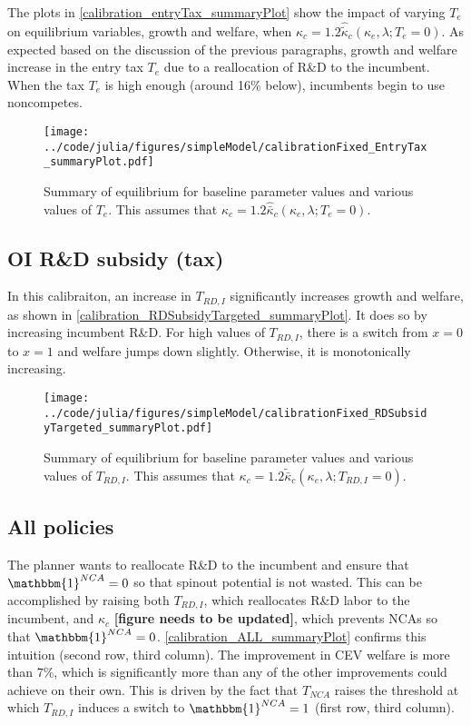 \documentclass[11pt,english]{article}
\begin{document}
The plots in \autoref{calibration_entryTax_summaryPlot} show the impact of varying $T_e$ on equilibrium variables, growth and welfare, when $\kappa_c = 1.2 \hat{\tilde{\kappa}}_c(\kappa_e,\lambda;T_e = 0)$. As expected based on the discussion of the previous paragraphs, growth and welfare increase in the entry tax $T_e$ due to a reallocation of R\&D to the incumbent. When the tax $T_e$ is high enough (around 16\% below), incumbents begin to use noncompetes.  

\begin{figure}[]
	\texttt{[image: ../code/julia/figures/simpleModel/calibrationFixed\_EntryTax\_summaryPlot.pdf]}
	\caption{Summary of equilibrium for baseline parameter values and various values of $T_e$. This assumes that $\kappa_c = 1.2 \hat{\bar{\kappa}}_c(\kappa_e,\lambda;T_e = 0)$.}
	\label{calibration_entryTax_summaryPlot}
\end{figure}

\subsection{OI R\&D subsidy (tax)}\label{cs:oi_rd_subsidy}

In this calibraiton, an increase in $T_{RD,I}$ significantly increases growth and welfare, as shown in \autoref{calibration_RDSubsidyTargeted_summaryPlot}. It does so by increasing incumbent R\&D. For high values of $T_{RD,I}$, there is a switch from $x = 0$ to $x = 1$ and welfare jumps down slightly. Otherwise, it is monotonically increasing. 

\begin{figure}[]
	\texttt{[image: ../code/julia/figures/simpleModel/calibrationFixed\_RDSubsidyTargeted\_summaryPlot.pdf]}
	\caption{Summary of equilibrium for baseline parameter values and various values of $T_{RD,I}$. This assumes that $\kappa_c = 1.2 \tilde{\bar{\kappa}}_c(\kappa_e,\lambda;T_{RD,I} = 0)$.}
	\label{calibration_RDSubsidyTargeted_summaryPlot}
\end{figure}


\subsection{All policies}

The planner wants to reallocate R\&D to the incumbent and ensure that $\mathbbm{1}^{NCA} = 0$ so that spinout potential is not wasted. This can be accomplished by raising both $T_{RD,I}$, which reallocates R\&D labor to the incumbent, and $\kappa_c$ \textbf{[figure needs to be updated]}, which prevents NCAs so that $\mathbbm{1}^{NCA} = 0$. \autoref{calibration_ALL_summaryPlot} confirms this intuition (second row, third column). The improvement in CEV welfare is more than 7\%, which is significantly more than any of the other improvements could achieve on their own. This is driven by the fact that $T_{NCA}$ raises the threshold at which $T_{RD,I}$ induces a switch to $\mathbbm{1}^{NCA} = 1$ (first row, third column).
\end{document}
